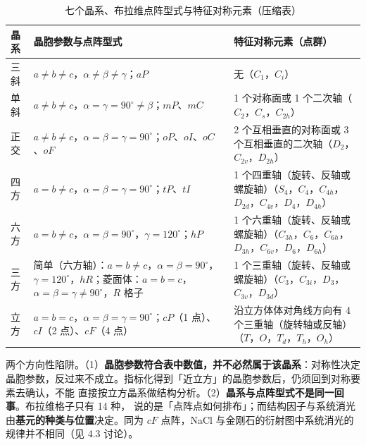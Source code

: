\begin{table}[htbp]
\centering
\caption{七个晶系、布拉维点阵型式与特征对称元素（压缩表）}
\label{tab:crystal-systems}
{\srcsize
\begin{tabularx}{\columnwidth}{@{}>{\raggedright\arraybackslash}p{24mm}XX@{}}
\toprule
晶系 & 晶胞参数与点阵型式 & 特征对称元素（点群） \\
\midrule
三斜 & $a\neq b\neq c$，$\alpha\neq\beta\neq\gamma$；$aP$ & 无（$C_1$，$C_i$） \\
单斜 & $a\neq b\neq c$，$\alpha=\gamma=90^{\circ}\neq\beta$；$mP$、$mC$ & 1 个对称面或 1 个二次轴（$C_2$，$C_s$，$C_{2h}$） \\
正交 & $a\neq b\neq c$，$\alpha=\beta=\gamma=90^{\circ}$；$oP$、$oI$、$oC$、$oF$ & 2 个互相垂直的对称面或 3 个互相垂直的二次轴（$D_2$，$C_{2v}$，$D_{2h}$） \\
四方 & $a=b\neq c$，$\alpha=\beta=\gamma=90^{\circ}$；$tP$、$tI$ & 1 个四重轴（旋转、反轴或螺旋轴）（$S_4$，$C_4$，$C_{4h}$，$D_{2d}$，$C_{4v}$，$D_4$，$D_{4h}$） \\
六方 & $a=b\neq c$，$\alpha=\beta=90^{\circ}$，$\gamma=120^{\circ}$；$hP$ & 1 个六重轴（旋转、反轴或螺旋轴）（$C_{3h}$，$C_6$，$C_{6h}$，$D_{3h}$，$C_{6v}$，$D_6$，$D_{6h}$） \\
三方 & 简单（六方轴）：$a=b\neq c$，$\alpha=\beta=90^{\circ}$，$\gamma=120^{\circ}$，$hR$；菱面体：$a=b=c$，$\alpha=\beta=\gamma\neq90^{\circ}$，$R$ 格子 & 1 个三重轴（旋转、反轴或螺旋轴）（$C_3$，$C_{3i}$，$D_3$，$C_{3v}$，$D_{3d}$） \\
立方 & $a=b=c$，$\alpha=\beta=\gamma=90^{\circ}$；$cP$（1 点）、$cI$（2 点）、$cF$（4 点） & 沿立方体体对角线方向有 4 个三重轴（旋转轴或反轴）（$T$，$O$，$T_d$，$T_h$，$O_h$） \\
\bottomrule
\end{tabularx}}
\end{table}

\begin{pitfall}
两个方向性陷阱。（1）\textbf{晶胞参数符合表中数值，并不必然属于该晶系}：对称性决定
晶胞参数，反过来不成立。指标化得到「近立方」的晶胞参数后，仍须回到对称要素去确认，不能
直接按立方晶系做结构分析。（2）\textbf{晶系与点阵型式不是同一回事}。布拉维格子只有 14 种，
说的是「点阵点如何排布」；而结构因子与系统消光由\textbf{基元的种类与位置}决定。同为
$cF$ 点阵，NaCl 与金刚石的衍射图中系统消光的规律并不相同（见 4.3 讨论）。
\end{pitfall}

